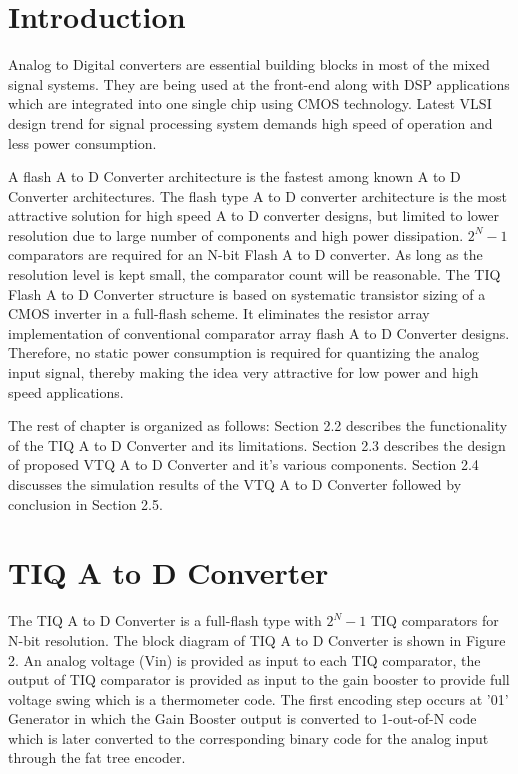 \section{Introduction}

\par
\hspace{1.2cm}Analog to Digital converters are essential building blocks in most of the mixed signal systems. They are being used at the front-end along with DSP applications which are integrated into one single chip using CMOS technology. Latest VLSI design trend for signal processing system demands high speed of operation and less power consumption.\\

\par
\hspace{0.5cm}A flash A to D Converter architecture is the fastest among known A to D Converter architectures. The flash type A to D converter architecture is the most attractive solution for high speed A to D converter designs, but limited to lower resolution due to large number of components and high power dissipation. $2^N-1$ comparators are required for an N-bit Flash A to D converter. As long as the resolution level is kept small, the comparator count will be reasonable. The TIQ Flash A to D Converter structure is based on systematic transistor sizing of a CMOS inverter in a full-flash scheme. It eliminates the resistor array implementation of conventional comparator array flash A to D Converter designs. Therefore, no static power consumption is required for quantizing the analog input signal, thereby making the idea very attractive for low power and high speed applications.\\

\par
\hspace{0.5cm}The rest of chapter is organized as follows: Section 2.2 describes the functionality of the TIQ A to D Converter and its limitations. Section 2.3 describes the design of proposed VTQ A to D Converter and it's various components. Section 2.4 discusses the simulation results of the VTQ A to D Converter followed by conclusion in Section 2.5.


\section{TIQ A to D Converter}


\par
\hspace{1.2cm}The TIQ A to D Converter is a full-flash type with $2^N-1$ TIQ comparators for N-bit resolution. The block diagram of TIQ A to D Converter is shown in Figure 2. An analog voltage (Vin) is provided as input to each TIQ comparator, the output of TIQ comparator is provided as input to the gain booster to provide full voltage swing which is a thermometer code. The first encoding step occurs at '01' Generator in which the Gain Booster output is converted to 1-out-of-N code which is later converted to the corresponding binary code for the analog input through the fat tree encoder.\\


